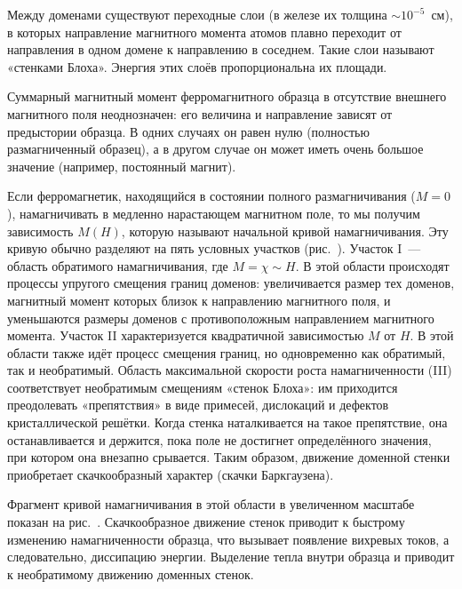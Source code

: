 Между доменами существуют переходные слои (в железе их толщина $\sim 10^{-5}$~см), в которых направление магнитного момента атомов плавно переходит от направления в одном домене к направлению в соседнем. Такие слои называют «стенками Блоха». Энергия этих слоёв пропорциональна их площади.


Суммарный магнитный момент ферромагнитного образца в отсутствие внешнего магнитного поля неоднозначен: его величина и направление зависят от предыстории образца. В одних случаях он равен нулю (полностью размагниченный образец), а в другом случае он может иметь очень большое значение (например, постоянный магнит).

Если ферромагнетик, находящийся в состоянии полного размагничивания ($M = 0$), намагничивать в медленно нарастающем магнитном поле, то мы получим зависимость $M(H)$, которую называют начальной кривой намагничивания. Эту кривую обычно разделяют на пять условных участков (рис.~). Участок I~--- область обратимого намагничивания, где $M =\chi \sim H$. В этой области происходят процессы упругого смещения границ доменов: увеличивается размер тех доменов, магнитный момент которых близок к направлению магнитного поля, и уменьшаются размеры доменов с противоположным направлением магнитного момента. Участок II характеризуется квадратичной зависимостью $M$ от $H$. В этой области также идёт процесс смещения границ, но одновременно как обратимый, так и необратимый. Область максимальной скорости роста намагниченности (III) соответствует необратимым смещениям «стенок Блоха»: им приходится преодолевать «препятствия» в виде примесей, дислокаций и дефектов кристаллической решётки. Когда стенка наталкивается на такое препятствие, она останавливается и держится, пока поле не достигнет определённого значения, при котором она внезапно срывается. Таким образом, движение доменной стенки приобретает скачкообразный характер (скачки Баркгаузена).

Фрагмент кривой намагничивания в этой области в увеличенном масштабе показан на рис.~. Скачкообразное движение стенок приводит к быстрому изменению намагниченности образца, что вызывает появление вихревых токов, а следовательно, диссипацию энергии. Выделение тепла внутри образца и приводит к необратимому движению доменных стенок.

